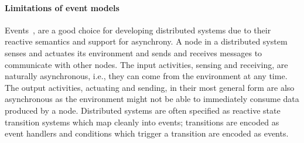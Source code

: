 

\paragraph*{Limitations of event models}
Events~\cite{lamport1978time}, \cite{manna1992temporal} are a good choice for developing distributed systems due to their reactive semantics and support for asynchrony.
A node in a distributed system senses and actuates its environment and sends and receives messages to communicate with other nodes.
The input activities, sensing and receiving, are naturally asynchronous, i.e., they can come from the environment at any time.
The output activities, actuating and sending, in their most general form are also asynchronous as the environment might not be able to immediately consume data produced by a node.
Distributed systems are often specified as reactive state transition systems which map cleanly into events; transitions are encoded as event handlers and conditions which trigger a transition are encoded as events.

